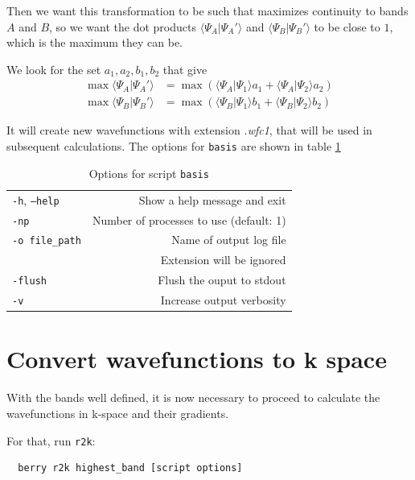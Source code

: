 \documentclass[a4paper,12pt]{report}
\begin{document}
 Then we want this transformation to be such that maximizes continuity to bands $A$ and $B$, so we want
 the dot products $\langle \Psi_A|\Psi_A'\rangle $ and $\langle \Psi_B|\Psi_B'\rangle $ to be close to $1$,
 which is the maximum they can be.

 We look for the set $a_1, a_2, b_1, b_2$ that give
 \begin{align*}
  \max \langle \Psi_A|\Psi_A'\rangle &= \max \left( \langle \Psi_A|\Psi_1\rangle a_1 + \langle \Psi_A|\Psi_2\rangle a_2\right) \\
  \max \langle \Psi_B|\Psi_B'\rangle &= \max \left( \langle \Psi_B|\Psi_1\rangle b_1 + \langle \Psi_B|\Psi_2\rangle b_2\right)
 \end{align*}

 It will create new wavefunctions with extension \emph{.wfc1}, that will be used in subsequent calculations.
The options for \texttt{basis} are shown in table \ref{tab:options_basis}

\begin{table}[h]
 \centering
 \caption{Options for script \texttt{basis}}\label{tab:options_basis}
 \begin{tabular}[]{lr}
 \hline
  \texttt{-h}, \texttt{--help}  &\hspace*{2cm} Show a help message and exit \\
  \texttt{-np}                  & Number of processes to use (default: 1) \\
  \texttt{-o file\_path}        & Name of output log file\\
                                & Extension will be ignored \\
  \texttt{-flush}               & Flush the ouput to stdout \\
  \texttt{-v}                   & Increase output verbosity \\
  \hline
 \end{tabular}
\end{table}


\section{Convert wavefunctions to k space}

With the bands well defined, it is now necessary to proceed to calculate the wavefunctions in k-space and their gradients.

For that, run \texttt{r2k}:
\begin{verbatim}
  berry r2k highest_band [script options]
 \end{verbatim}
\end{document}
